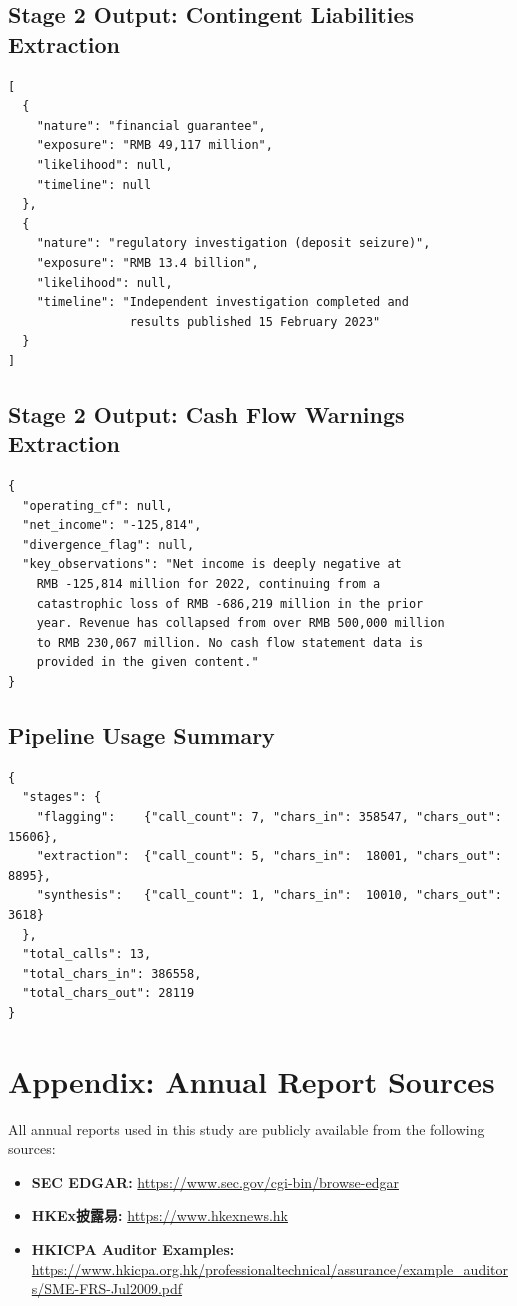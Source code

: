 \documentclass[12pt,a4paper]{article}
\begin{document}
\subsection{Stage 2 Output: Contingent Liabilities Extraction}

\begin{lstlisting}[language={}]
[
  {
    "nature": "financial guarantee",
    "exposure": "RMB 49,117 million",
    "likelihood": null,
    "timeline": null
  },
  {
    "nature": "regulatory investigation (deposit seizure)",
    "exposure": "RMB 13.4 billion",
    "likelihood": null,
    "timeline": "Independent investigation completed and
                 results published 15 February 2023"
  }
]
\end{lstlisting}

\subsection{Stage 2 Output: Cash Flow Warnings Extraction}

\begin{lstlisting}[language={}]
{
  "operating_cf": null,
  "net_income": "-125,814",
  "divergence_flag": null,
  "key_observations": "Net income is deeply negative at
    RMB -125,814 million for 2022, continuing from a
    catastrophic loss of RMB -686,219 million in the prior
    year. Revenue has collapsed from over RMB 500,000 million
    to RMB 230,067 million. No cash flow statement data is
    provided in the given content."
}
\end{lstlisting}

\subsection{Pipeline Usage Summary}

\begin{lstlisting}[language={}]
{
  "stages": {
    "flagging":    {"call_count": 7, "chars_in": 358547, "chars_out": 15606},
    "extraction":  {"call_count": 5, "chars_in":  18001, "chars_out":  8895},
    "synthesis":   {"call_count": 1, "chars_in":  10010, "chars_out":  3618}
  },
  "total_calls": 13,
  "total_chars_in": 386558,
  "total_chars_out": 28119
}
\end{lstlisting}

\section{Appendix: Annual Report Sources}

All annual reports used in this study are publicly available from the following sources:

\begin{itemize}[leftmargin=1.5cm]
  \item \textbf{SEC EDGAR:} \url{https://www.sec.gov/cgi-bin/browse-edgar}
  \item \textbf{HKEx披露易:} \url{https://www.hkexnews.hk}
  \item \textbf{HKICPA Auditor Examples:} \url{https://www.hkicpa.org.hk/professionaltechnical/assurance/example_auditors/SME-FRS-Jul2009.pdf}
\end{itemize}
\end{document}
